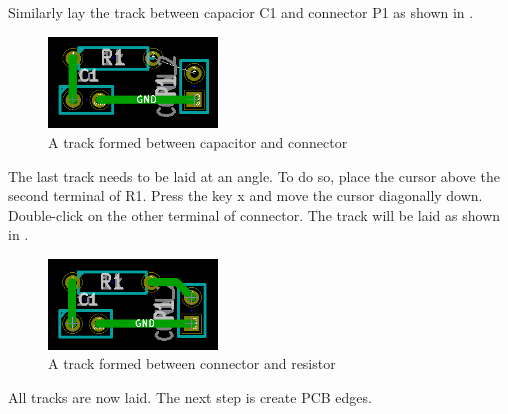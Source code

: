 Similarly lay the track between capacior C1 and connector P1 as shown in .
\begin{figure}
\centering
\includegraphics[width=0.4\textwidth]{figures/track2}
\caption{A track formed between capacitor and connector}
\label{track2}
\end{figure}
The last track needs to be laid at an angle. To do so, place the cursor above the second terminal of R1. Press the key x and move the cursor diagonally down. Double-click on the other terminal of connector. The track will be laid as shown in .
\begin{figure}
\centering
\includegraphics[width=0.4\textwidth]{figures/track3}
\caption{A track formed between connector and resistor}
\label{track3}
\end{figure}
All tracks are now laid. The next step is create PCB edges. 

